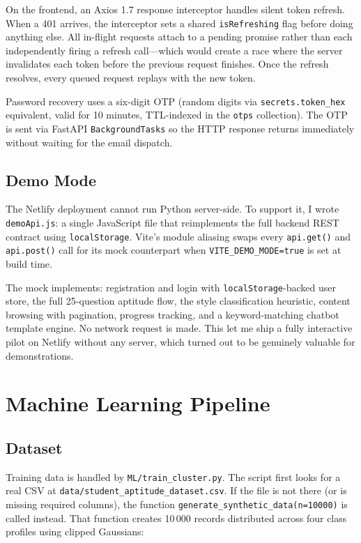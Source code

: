 \documentclass[12pt,a4paper]{article}
\begin{document}
On the frontend, an Axios 1.7 response interceptor handles
silent token refresh. When a 401 arrives, the interceptor sets a
shared \texttt{isRefreshing} flag before doing anything else. All
in-flight requests attach to a pending promise rather than each
independently firing a refresh call---which would create a race where
the server invalidates each token before the previous request
finishes. Once the refresh resolves, every queued request replays
with the new token.

Password recovery uses a six-digit OTP (random digits via
\texttt{secrets.token\_hex} equivalent, valid for 10 minutes,
TTL-indexed in the \texttt{otps} collection). The OTP is sent
via FastAPI \texttt{BackgroundTasks} so the HTTP response returns
immediately without waiting for the email dispatch.

\subsection{Demo Mode}

The Netlify deployment cannot run Python server-side. To support
it, I wrote \texttt{demoApi.js}: a single JavaScript file that
reimplements the full backend REST contract using
\texttt{localStorage}. Vite's module aliasing swaps every
\texttt{api.get()} and \texttt{api.post()} call for its mock
counterpart when \texttt{VITE\_DEMO\_MODE=true} is set at build time.

The mock implements: registration and login with
\texttt{localStorage}-backed user store, the full 25-question
aptitude flow, the style classification heuristic, content browsing
with pagination, progress tracking, and a keyword-matching chatbot
template engine. No network request is made. This let me ship a
fully interactive pilot on Netlify without any server, which turned
out to be genuinely valuable for demonstrations.

\section{Machine Learning Pipeline}

\subsection{Dataset}

Training data is handled by \texttt{ML/train\_cluster.py}. The
script first looks for a real CSV at
\texttt{data/student\_aptitude\_dataset.csv}. If the file is not
there (or is missing required columns), the function
\texttt{generate\_synthetic\_data(n=10000)} is called instead.
That function creates 10\,000 records distributed across four
class profiles using clipped Gaussians:
\end{document}
